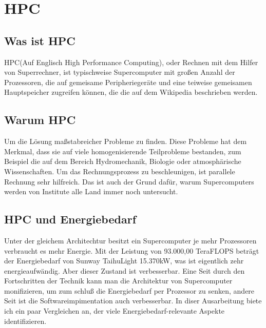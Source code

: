 \chapter{HPC}
\label{chap:HPC}

\section{Was ist HPC}
\label{sec:Was ist HPC}
HPC(Auf Englisch High Performance Computing), oder Rechnen mit dem Hilfer von Superrechner, ist typischweise Supercomputer mit großen Anzahl der Prozessoren, die auf gemeisame Peripheriegeräte und eine teiweise gemeisamen Hauptspeicher zugreifen können, die die auf dem Wikipedia beschrieben werden. 

\section{Warum HPC}
\label{sec:Warum HPC}
Um die Lösung maßstabreicher Probleme zu finden. Diese Probleme hat dem Merkmal, dass sie auf viele homogenisierende Teilprobleme bestanden, zum Beispiel die auf dem Bereich Hydromechanik, Biologie oder atmosphärische Wissenschaften. Um das Rechnungsprozess zu beschleunigen, ist parallele Rechnung sehr hilfreich. Das ist auch der Grund dafür, warum Supercomputers werden von Institute alle Land immer noch untersucht.

\section{HPC und Energiebedarf}
\label{sec:HPC und Energiebedarf}
Unter der gleichem Architechtur besitzt ein Supercomputer je mehr Prozessoren verbraucht es mehr Energie. Mit der Leistung von 93.000,00 TeraFLOPS beträgt der Energiebedarf von Sunway TaihuLight 15.370kW, was ist eigentlich zehr energieaufwändig. Aber dieser Zustand ist verbesserbar. Eine Seit durch den Fortschritten der Technik kann man die Architektur von Supercomputer monifizieren, um zum schluß die Energiebedarf per Prozessor zu senken, andere Seit ist die Softwareimpimentation auch verbesserbar. In diser Ausarbeitung biete ich ein paar Vergleichen an, der viele Energiebedarf-relevante Aspekte identifizieren.
